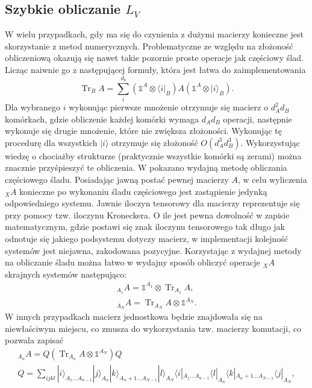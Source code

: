 \documentclass[10pt]{article} %
\DeclareMathOperator{\Trs}{Tr}
\newcommand{\Ket}[1]{|#1\rangle}
\newcommand{\Bra}[1]{\langle#1|}
\newcommand{\I}{\mathbb{1}}
\begin{document}


\begin{appendices}
\section{Szybkie obliczanie $L_V$}
W wielu przypadkach, gdy ma się do czynienia z dużymi macierzy konieczne jest skorzystanie z metod numerycznych. Problematyczne ze względu na złożoność obliczeniową okazują się nawet takie pozornie proste operacje jak częściowy ślad. Licząc naiwnie go z następującej formuły, która jest łatwa do zaimplementowania
\begin{equation}
\Trs_B A = \sum^{d_b}_i (\I^A \otimes \Bra{i}_B)A(\I^A \otimes \Ket{i}_B).
\end{equation} Dla wybranego $i$ wykonując pierwsze mnożenie otrzymuje się macierz o $d_A^2d_B$ komórkach, gdzie obliczenie każdej komórki wymaga $d_Ad_B$ operacji, następnie wykonuje się drugie mnożenie, które nie zwiększa złożoności. Wykonując tę procedurę dla wszystkich $\Ket{i}$ otrzymuje się złożoność $O(d_A^3d_B^3)$. Wykorzystując wiedzę o chociażby strukturze (praktycznie wszystkie komórki są zerami) można znacznie przyśpieszyć te obliczenia.
W \cite{partial_trace} pokazano wydajną metodę obliczania częściowego śladu. Posiadając jawną postać pewnej macierzy $A$, w celu wyliczenia ${}_XA$ konieczne po wykonaniu śladu częściowego jest zastąpienie jedynką odpowiedniego systemu. Jawnie iloczyn tensorowy dla macierzy reprezentuje się przy pomocy tzw. iloczynu Kroneckera. O ile jest pewna dowolność w zapisie matematycznym, gdzie postawi się znak iloczynu tensorowego tak długo jak odnotuje się jakiego podsystemu dotyczy macierz, w implementacji kolejność systemów jest niejawna, zakodowana pozycyjne. Korzystając z wydajnej metody na obliczanie śladu
można łatwo w wydajny sposób obliczyć operacje ${}_XA$ skrajnych systemów następująco:
\begin{gather}
{}_{A_1}A= \I^{A_1} \otimes \Trs_{A_1} A,\\
{}_{A_ N}A = \Trs_{A_N} A \otimes \I^{A_N}.
\end{gather}
W innych przypadkach macierz jednostkowa będzie znajdowała się na niewłaściwym miejscu, co zmusza do wykorzystania tzw. macierzy komutacji, co pozwala zapisać
\begin{gather}
{}_{A_n}A = Q\left( \Trs_{A_n}A \otimes \I^{A_N} \right)Q \\
Q = \sum_{ijkl} \Ket{i}_{A_1 \dots A_{n-1}} \Ket{j}_{A_n} \Ket{k}_{A_n+1 \dots A_{N-1}} \Ket{l}_{A_N}\Bra{i}_{A_1 \dots A_{n-1}} \Bra{l}_{A_n} \Bra{k}_{A_n+1 \dots A_{N-1}} \Bra{j}_{A_N},

\end{gather}
\end{appendices}
\end{document}

